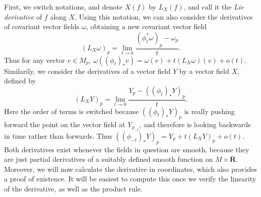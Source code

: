 First, we switch notations, and denote $X(f)$ by $L_X(f)$, and call it the \emph{Lie derivative} of $f$ along $X$. Using this notation, we can also consider the derivatives of covariant vector fields $\omega$, obtaining a new covariant vector field
%
\[ (L_X \omega)_p = \lim_{t \to 0} \frac{(\phi_t^*\omega)_p - \omega_p}{t}. \]
%
%
%
%
%
%
%
%
Thus for any vector $v \in M_p$, $\omega((\phi_t)_* v) = \omega(v) + t (L_X \omega)(v) + o(t)$. Similarily, we consider the derivatives of a vector field $Y$ by a vector field $X$, defined by
%
\[ (L_X Y)_p = \lim_{t \to 0} \frac{Y_p - ((\phi_t)_* Y)_p}{t}. \]
%
Here the order of terms is switched because $((\phi_t)_* Y)_p$ is really pushing forward the point on the vector field at $Y_{\phi_{-t}}$, and therefore is looking backwards in time rather than forwards. Thus $((\phi_{-t})_* Y)_p = Y_p + t (L_X Y)_p + o(t)$. Both derivatives exist whenever the fields in question are smooth, because they are just partial derivatives of a suitably defined smooth function on $M \times \mathbf{R}$. Moreover, we will now calculate the derivative in coordinates, which also provides a proof of existence. It will be easiest to compute this once we verify the linearity of the derivative, as well as the product rule.

